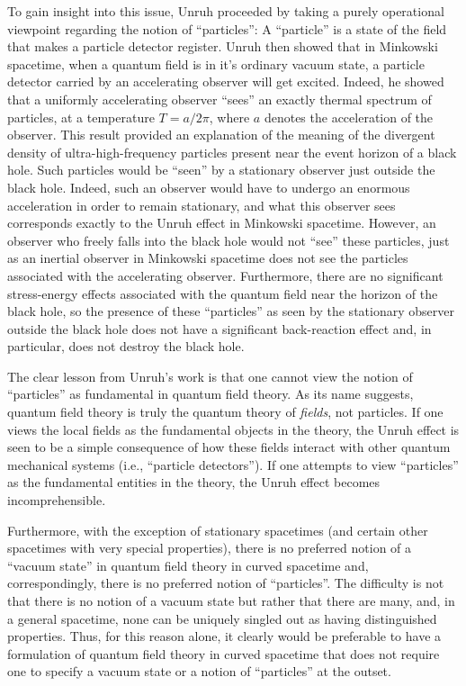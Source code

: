 To gain insight into this issue, Unruh \cite{u2} proceeded by taking a
purely operational viewpoint regarding the notion of ``particles'': A
``particle'' is a state of the field that makes a particle detector
register. Unruh then showed that in Minkowski spacetime, when a
quantum field is in it's ordinary vacuum state, a particle detector
carried by an accelerating observer will get excited. Indeed, he
showed that a uniformly accelerating observer ``sees'' an exactly
thermal spectrum of particles, at a temperature $T = a/2 \pi$, where
$a$ denotes the acceleration of the observer. This result provided an
explanation of the meaning of the divergent density of
ultra-high-frequency particles present near the event horizon of a
black hole. Such particles would be ``seen'' by a stationary observer
just outside the black hole. Indeed, such an observer would have to
undergo an enormous acceleration in order to remain stationary, and
what this observer sees corresponds exactly to the Unruh effect in
Minkowski spacetime. However, an observer who freely falls into the
black hole would not ``see'' these particles, just as an inertial
observer in Minkowski spacetime does not see the particles associated
with the accelerating observer. Furthermore, there are no significant
stress-energy effects associated with the quantum field near the
horizon of the black hole, so the presence of these ``particles'' as
seen by the stationary observer outside the black hole does not have a
significant back-reaction effect and, in particular, does not destroy
the black hole.

The clear lesson from Unruh's work is that one cannot view the notion
of ``particles'' as fundamental in quantum field theory. As its name
suggests, quantum field theory is truly the quantum theory of {\it
fields}, not particles. If one views the local fields as the
fundamental objects in the theory, the Unruh effect is seen to be a
simple consequence of how these fields interact with other quantum
mechanical systems (i.e., ``particle detectors''). If one attempts to view
``particles'' as the fundamental entities in the theory, the Unruh
effect becomes incomprehensible.

Furthermore, with the exception of stationary spacetimes (and certain
other spacetimes with very special properties), there is no preferred
notion of a ``vacuum state'' in quantum field theory in curved
spacetime and, correspondingly, there is no preferred notion of
``particles''. The difficulty is not that there is no notion of a
vacuum state but rather that there are many, and, in a general
spacetime, none can be uniquely singled out as having distinguished
properties. Thus, for this reason alone, it clearly would be
preferable to have a formulation of quantum field theory in curved
spacetime that does not require one to specify a vacuum state or a
notion of ``particles'' at the outset.

